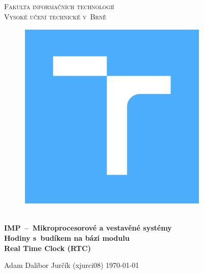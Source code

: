 \documentclass[11pt,a4paper]{article}
\begin{document}

\begin{titlepage}
    \begin{center}
        \Huge
        \textsc{
            Fakulta informačních technologií\\
            Vysoké učení technické v~Brně
        }
        \vspace{100px}
        \begin{figure}[!h]
            \centering
            \includegraphics[scale=0.7]{img/vutfitlogo.png}
        \end{figure}
        \\[20mm]
        \huge{
            \textbf{
                IMP \,--\, Mikroprocesorové a vestavěné systémy
            }
        }
        \\[2em]
        \LARGE{
            \textbf{
                Hodiny s~budíkem na bázi modulu \\ Real Time Clock (RTC)
            }
        }
        \vfill
    \end{center}
        \Large{
            Adam Dalibor Jurčík (xjurci08) \hfill \today
        }

\end{titlepage}


\setlength{\parskip}{0pt}
\hypersetup{hidelinks}
\tableofcontents
\setlength{\parskip}{0pt}

\newpage %
\end{document}
